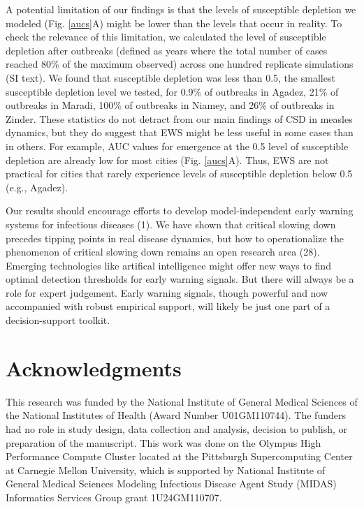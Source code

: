 \documentclass[3p]{elsarticle} %
\begin{document}
A potential limitation of our findings is that the levels of susceptible
depletion we modeled (Fig. \ref{aucs}A) might be lower than the levels
that occur in reality. To check the relevance of this limitation, we
calculated the level of susceptible depletion after outbreaks (defined
as years where the total number of cases reached 80\% of the maximum
observed) across one hundred replicate simulations (SI text). We found
that susceptible depletion was less than 0.5, the smallest susceptible
depletion level we tested, for 0.9\% of outbreaks in Agadez, 21\% of
outbreaks in Maradi, 100\% of outbreaks in Niamey, and 26\% of outbreaks
in Zinder. These statistics do not detract from our main findings of CSD
in measles dynamics, but they do suggest that EWS might be less useful
in some cases than in others. For example, AUC values for emergence at
the 0.5 level of susceptible depletion are already low for most cities
(Fig. \ref{aucs}A). Thus, EWS are not practical for cities that rarely
experience levels of susceptible depletion below 0.5 (e.g., Agadez).

Our results should encourage efforts to develop model-independent early
warning systems for infectious diseases (1). We have shown that critical
slowing down precedes tipping points in real disease dynamics, but how
to operationalize the phenomenon of critical slowing down remains an
open research area (28). Emerging technologies like artifical
intelligence might offer new ways to find optimal detection thresholds
for early warning signals. But there will always be a role for expert
judgement. Early warning signals, though powerful and now accompanied
with robust empirical support, will likely be just one part of a
decision-support toolkit.

\section{Acknowledgments}\label{acknowledgments}

This research was funded by the National Institute of General Medical
Sciences of the National Institutes of Health (Award Number
U01GM110744). The funders had no role in study design, data collection
and analysis, decision to publish, or preparation of the manuscript.
This work was done on the Olympus High Performance Compute Cluster
located at the Pittsburgh Supercomputing Center at Carnegie Mellon
University, which is supported by National Institute of General Medical
Sciences Modeling Infectious Disease Agent Study (MIDAS) Informatics
Services Group grant 1U24GM110707.
\end{document}
